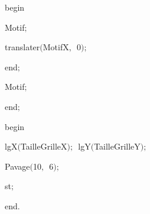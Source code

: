 {\vspace{\neglskip}\mbox{\blc  \blk\blk\blk\blk\idt  \mcl begin\idt }\par 
\vspace{\neglskip}\mbox{\blc  \blk\blk\blk\blk\blk\idt  Motif$;$}\par 
\vspace{\neglskip}\mbox{\blc  \blk\blk\blk\blk\blk\idt  translater$($MotifX$,$\ 0$)$$;$}\par 
\vspace{\neglskip}\mbox{\blc  \blk\blk\blk\blk\idt  \mcl end\idt $;$}\par 
\vspace{\neglskip}\mbox{\blc  \blk\blk\blk\idt  Motif$;$}\par 
\vspace{\neglskip}\mbox{\blc  \blk\idt  \mcl end\idt $;$}\par 
\medskip

\vspace{\neglskip}\mbox{\blc  \idt  \mcl begin\idt }\par 
\vspace{\neglskip}\mbox{\blc  \blk\idt  lgX$($TailleGrilleX$)$$;$\ lgY$($TailleGrilleY$)$$;$}\par 
\vspace{\neglskip}\mbox{\blc  \blk\idt  Pavage$($10$,$\ 6$)$$;$}\par 
\vspace{\neglskip}\mbox{\blc  \blk\idt  st$;$}\par 
\vspace{\neglskip}\mbox{\blc  \idt  \mcl end\idt $.$}\par 

\medskip }

